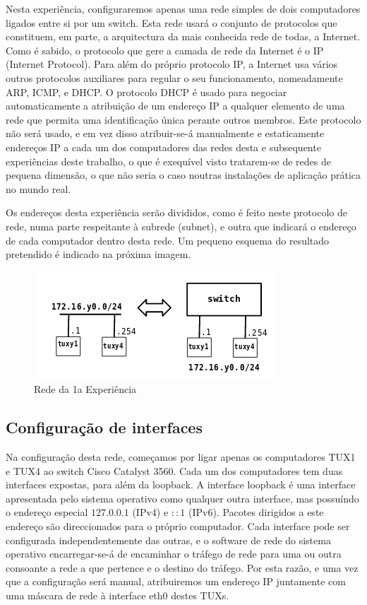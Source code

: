 \documentclass[a4paper,11pt,titlepage]{article}
\begin{document}
Nesta experiência, configuraremos apenas uma rede simples de dois computadores
ligados entre si por um switch. Esta rede usará o conjunto de protocolos que
constituem, em parte, a arquitectura da mais conhecida rede de todas, a
Internet. Como é sabido, o protocolo que gere a camada de rede da Internet é
o IP (Internet Protocol).  Para além do próprio protocolo IP, a Internet usa
vários outros protocolos auxiliares para regular o seu funcionamento,
nomeadamente ARP, ICMP, e DHCP.
O protocolo DHCP é usado para negociar automaticamente a atribuição de um
endereço IP a qualquer elemento de uma rede que permita uma identificação única
perante outros membros. Este protocolo não será usado, e em vez disso
atribuir-se-á manualmente e estaticamente endereços IP a cada um dos
computadores das redes desta e subsequente experiências deste trabalho, o que é
exequível visto tratarem-se de redes de pequena dimensão, o que não seria o
caso noutras instalações de aplicação prática no mundo real.

Os endereços desta experiência serão divididos, como é feito neste protocolo de
rede, numa parte respeitante à subrede (subnet), e outra que indicará o
endereço de cada computador dentro desta rede. Um pequeno esquema do resultado
pretendido é indicado na próxima imagem.

\begin{figure}[H]
    \center
    \includegraphics[scale=0.45]{res/network1.png}
    \caption{Rede da 1a Experiência}
    \label{fig:network1.png}
\end{figure}

\subsection*{Configuração de interfaces}

Na configuração desta rede, começamos por ligar apenas os computadores TUX1 e
TUX4 ao switch Cisco Catalyst 3560. Cada um dos computadores tem duas
interfaces expostas, para além da loopback.
A interface loopback é uma interface apresentada pelo sistema operativo como
qualquer outra interface, mas possuíndo o endereço especial $127.0.0.1$
(IPv4) e $::1$ (IPv6). Pacotes dirigidos a este endereço são direccionados para o
próprio computador.
Cada interface pode ser configurada independentemente das outras, e o software
de rede do sistema operativo encarregar-se-á de encaminhar o tráfego de rede
para uma ou outra consoante a rede a que pertence e o destino do tráfego. Por esta razão, e uma vez que a configuração será manual, atribuiremos um endereço IP
juntamente com uma máscara de rede à interface eth0 destes TUXs.
\end{document}
